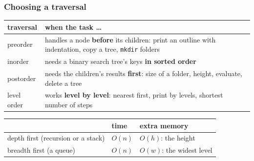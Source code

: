 \documentclass[aspectratio=169,10pt,compress]{beamer}
\begin{document}
\begin{frame}[t,fragile] \frametitle{Choosing a traversal}
  \begin{center}\small
  \begin{tabular}{lL{0.5\textwidth}}
    \toprule
    \textbf{traversal} & \textbf{when the task \dots} \\
    \midrule
    preorder           & handles a node \textbf{before} its children: print an outline with indentation, copy a tree, \texttt{mkdir} folders \\
    inorder            & needs a binary search tree's keys \textbf{in sorted order} \\
    postorder          & needs the children's results \textbf{first}: size of a folder, height, evaluate, delete a tree \\
    level order        & works \textbf{level by level}: nearest first, print by levels, shortest number of steps \\
    \bottomrule
  \end{tabular}
  \end{center}
  \vspace{0.3em}
  \begin{center}\small
  \begin{tabular}{lll}
    \toprule
                 & \textbf{time} & \textbf{extra memory} \\
    \midrule
    depth first (recursion or a stack) & $O(n)$ & $O(h)$: the height \\
    breadth first (a queue)            & $O(n)$ & $O(w)$: the widest level \\
    \bottomrule
  \end{tabular}
  \end{center}
\end{frame}

\end{document}
